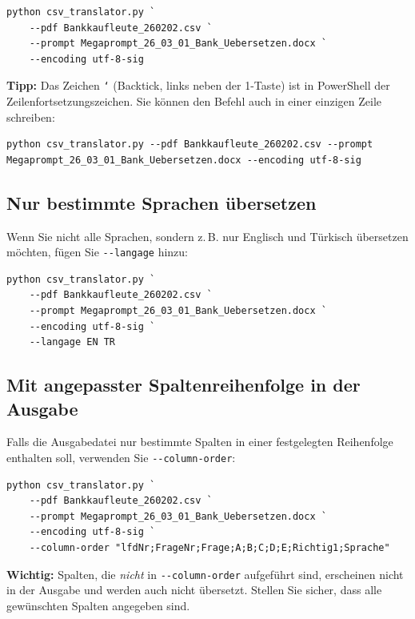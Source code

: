 \documentclass[a4paper,11pt]{article}
\newenvironment{hinweisbox}{%
  \begin{mdframed}[backgroundcolor=hinweis,linecolor=hinweisrand,linewidth=1pt,
    innerleftmargin=8pt,innerrightmargin=8pt,innertopmargin=6pt,innerbottommargin=6pt]
  \small}{%
  \end{mdframed}}
\newenvironment{achtungbox}{%
  \begin{mdframed}[backgroundcolor=achtung,linecolor=achtungrand,linewidth=1pt,
    innerleftmargin=8pt,innerrightmargin=8pt,innertopmargin=6pt,innerbottommargin=6pt]
  \small}{%
  \end{mdframed}}
\begin{document}
\begin{lstlisting}
python csv_translator.py `
    --pdf Bankkaufleute_260202.csv `
    --prompt Megaprompt_26_03_01_Bank_Uebersetzen.docx `
    --encoding utf-8-sig
\end{lstlisting}

\begin{hinweisbox}
\textbf{Tipp:} Das Zeichen \texttt{`} (Backtick, links neben der 1-Taste) ist in
PowerShell der Zeilenfortsetzungszeichen. Sie können den Befehl auch in einer
einzigen Zeile schreiben:
\begin{lstlisting}
python csv_translator.py --pdf Bankkaufleute_260202.csv --prompt Megaprompt_26_03_01_Bank_Uebersetzen.docx --encoding utf-8-sig
\end{lstlisting}
\end{hinweisbox}

\subsection{Nur bestimmte Sprachen übersetzen}

Wenn Sie nicht alle Sprachen, sondern z.\,B. nur Englisch und Türkisch übersetzen
möchten, fügen Sie \texttt{-{}-langage} hinzu:

\begin{lstlisting}
python csv_translator.py `
    --pdf Bankkaufleute_260202.csv `
    --prompt Megaprompt_26_03_01_Bank_Uebersetzen.docx `
    --encoding utf-8-sig `
    --langage EN TR
\end{lstlisting}

\subsection{Mit angepasster Spaltenreihenfolge in der Ausgabe}

Falls die Ausgabedatei nur bestimmte Spalten in einer festgelegten Reihenfolge
enthalten soll, verwenden Sie \texttt{-{}-column-order}:

\begin{lstlisting}
python csv_translator.py `
    --pdf Bankkaufleute_260202.csv `
    --prompt Megaprompt_26_03_01_Bank_Uebersetzen.docx `
    --encoding utf-8-sig `
    --column-order "lfdNr;FrageNr;Frage;A;B;C;D;E;Richtig1;Sprache"
\end{lstlisting}

\begin{achtungbox}
\textbf{Wichtig:} Spalten, die \emph{nicht} in \texttt{-{}-column-order} aufgeführt
sind, erscheinen nicht in der Ausgabe und werden auch nicht übersetzt. Stellen Sie
sicher, dass alle gewünschten Spalten angegeben sind.
\end{achtungbox}
\end{document}

